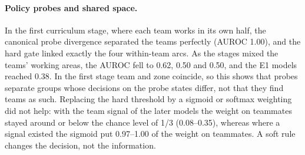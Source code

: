 \documentclass{article}
\theoremstyle{remark}
\newcommand{\ours}{PGCT}
\begin{document}
\begin{table}[t]
\centering
\small
{}
\caption{Same-team AUROC of probe statistics on frozen E1-map models (seed 1). Row 1: range over models; row 2: mean; window rows:
means over models, range over the two window-generating policies; 2--6 models per cell (Appendix~\ref{app:audit}). $Q_{\mathrm{diff}}$: queries whose actual reward differs between teams; $Q_{\mathrm{same}}$: the rest.
$^{a}$In-sample: the rule was chosen after inspecting these models. $^{b}$Observed pickups and deliveries of neighbours scored
against the observer's own goal; uses information that \ours{} does not exchange.}
\label{tab:audit}
\end{table}

\paragraph{Policy probes and shared space.} In the first curriculum stage, where each team works in its own half, the canonical
probe divergence separated the teams perfectly (AUROC 1.00), and the hard gate linked exactly the four within-team arcs. As
the stages mixed the teams' working areas, the AUROC fell to 0.62, 0.50 and 0.50, and the E1 models reached 0.38. In the
first stage team and zone coincide, so this shows that probes separate groups whose decisions on the probe states differ,
not that they find teams as such. Replacing the hard threshold by a sigmoid or softmax weighting did not help: with the
team signal of the later models the weight on teammates stayed around or below the chance level of 1/3 (0.08--0.35), whereas
where a signal existed the sigmoid put 0.97--1.00 of the weight on teammates. A soft rule changes the decision, not the
information.
\end{document}
